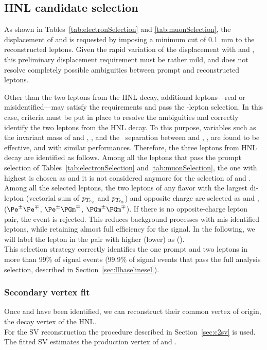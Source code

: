 \subsection{HNL candidate selection}
As shown in Tables~\ref{tab:electronSelection} and
\ref{tab:muonSelection},
the displacement of \ltwo and \lthree is requested by imposing a
minimum \absdxy cut of 0.1~mm to the reconstructed leptons.
Given the rapid variation of the \hnl displacement with \mhnl and
\mixpar, this preliminary displacement requirement must be rather
mild, and does not resolve completely possible ambiguities between
prompt and \displ reconstructed leptons.

Other than the two leptons from the HNL decay, additional
leptons---real or misidentified---may satisfy the \absdxy requirements
and pass the \displ-lepton selection. In this case, criteria must
be put in place to resolve the ambiguities and correctly identify the
two leptons from the HNL decay.
To this purpose, variables such as the invariant mass of \ltwo and
\lthree, \mtwol, and the \DR\ separation between \ltwo and \lthree, \DRtwol, are found to be
effective, and with similar performances.
Therefore, the three leptons from HNL decay are identified as follows.
Among all the leptons that pass the prompt selection of
Tables~\ref{tab:electronSelection} and \ref{tab:muonSelection}, the one
with highest \pt is chosen as \lone and it is not considered anymore for the selection of \ltwo and \lthree.
Among all the selected \displ leptons, the two leptons of any
flavor with the largest di-lepton \pt (vectorial sum of $p_{T_{\ell_2}}$
and $p_{T_{\ell_3}}$) and opposite charge are selected
as \ltwo and \lthree,
($\Pe^\pm\Pe^\mp$, $\Pe^\pm\PGm^\mp$, $\PGm^\pm\PGm^\mp$).
If there is no opposite-charge \displ lepton pair, the
event is rejected. This reduces background processes with
mis-identified leptons, while retaining almost full efficiency for the
signal. In the following, we will label the lepton in
the pair with higher (lower) \pt as \ltwo (\lthree).\\
This selection strategy correctly identifies the one prompt and two
\displ leptons in more than 99\% of signal events (99.9\% of
signal events that pass the full analysis selection, described in
Section~\ref{sec:llbaselinesel}).

\subsubsection{Secondary vertex fit}

Once \ltwo and \lthree have been identified, we can reconstruct their
common vertex of origin, \ie the decay vertex of the HNL. \\
For the SV reconstruction the procedure described in Section~\ref{sec:c2sv} is used.
The fitted SV estimates the production vertex of \ltwo and \lthree.

